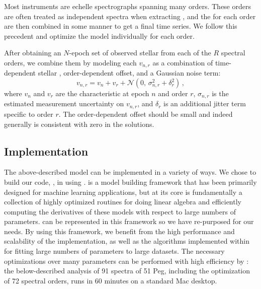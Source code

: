 \documentclass[modern]{aastex62}
\begin{document}
Most \EPRV instruments are echelle spectrographs spanning many orders. 
These orders are often treated as independent spectra when extracting \RVs, and the \RVs for each order are then combined in some manner to get a final time series. 
We follow this precedent and optimize the \wobble model individually for each order. 

After obtaining an $N$-epoch set of observed stellar \RVs from each of the $R$ spectral orders, we combine them by modeling each \RV $v_{n,r}$ as a combination of time-dependent stellar \RV, order-dependent \RV offset, and a Gaussian noise term:
\begin{equation}
v_{n,r} = v_n + v_r + \mathcal{N}(0,\,\sigma_{n,r}^{2} + \delta_r^2 )\,,
\end{equation}
where $v_n$ and $v_r$ are the characteristic \RVs at epoch $n$ and order $r$, $\sigma_{n,r}$ is the estimated measurement uncertainty on $v_{n,r}$, and $\delta_r$ is an additional jitter term specific to order $r$. 
The order-dependent \RV offset should be small and indeed generally is consistent with zero in the solutions.%

\subsection{Implementation}
\label{s:implementation}

The above-described model can be implemented in a variety of ways. We chose to build our code, \wobble, in  using \TF. 
\TF is a model building framework that has been primarily designed for machine
learning applications, but at its core \TF is fundamentally a collection of
highly optimized routines for doing linear algebra and efficiently computing the
derivatives of these models with respect to large numbers of parameters.
\wobble can be represented in this framework so we have re-purposed \TF for our
needs.
By using this framework, we benefit from the high performance and scalability
of the implementation, as well as the algorithms implemented within \TF for
fitting large numbers of parameters to large datasets.
The necessary optimizations over many parameters can be performed with high efficiency by \TF: the below-described analysis of 91 \HARPS spectra of 51 Peg, including the optimization of 72 spectral orders, runs in 60 minutes on a standard Mac desktop.
\end{document}
